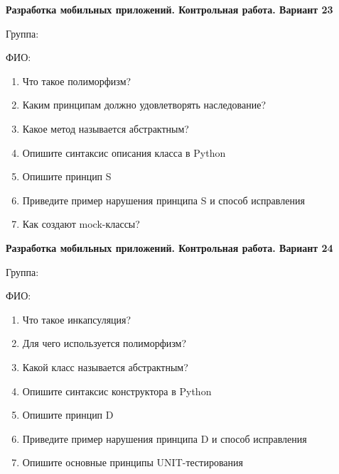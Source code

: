 \documentclass[12pt]{article}
\begin{document}
\vspace{40pt}\begin{minipage}{\textwidth}
\textbf{Разработка мобильных приложений. Контрольная работа. Вариант 23}

Группа: \underline{\hspace{3cm}}

ФИО: \underline{\hspace{10cm}}

\begin{enumerate}
\item Что такое полиморфизм?
\item Каким принципам должно удовлетворять наследование?
\item Какое метод называется абстрактным?
\item Опишите синтаксис описания класса в Python
\item Опишите принцип S
\item Приведите пример нарушения принципа S и способ исправления
\item Как создают mock-классы?

\end{enumerate}
\end{minipage}

\vspace{40pt}\begin{minipage}{\textwidth}
\textbf{Разработка мобильных приложений. Контрольная работа. Вариант 24}

Группа: \underline{\hspace{3cm}}

ФИО: \underline{\hspace{10cm}}

\begin{enumerate}
\item Что такое инкапсуляция?
\item Для чего используется полиморфизм?
\item Какой класс называется абстрактным?
\item Опишите синтаксис конструктора в Python
\item Опишите принцип D
\item Приведите пример нарушения принципа D и способ исправления
\item Опишите основные принципы UNIT-тестирования

\end{enumerate}
\end{minipage}
\end{document}

